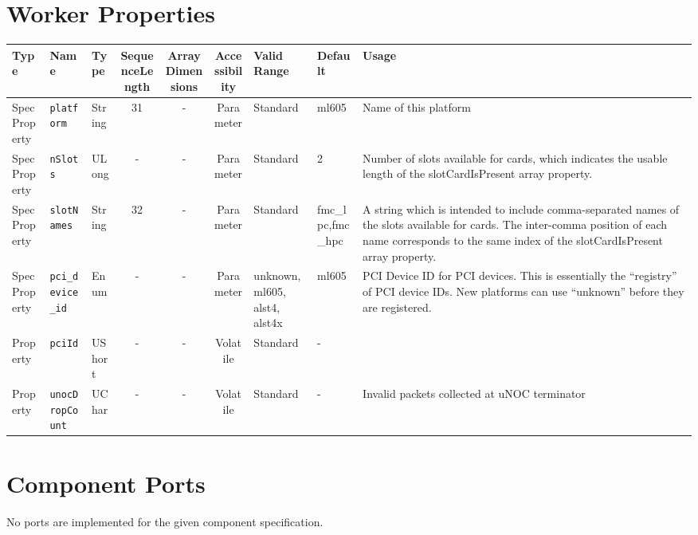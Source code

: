 \documentclass{article}
\begin{document}
\begin{landscape}
	\section*{Worker Properties}
	\begin{scriptsize}
		\begin{tabular}{|p{1.5cm}|p{2.5cm}|p{1cm}|c|c|c|p{2cm}|p{2cm}|p{3cm}|}
			\hline
			\rowcolor{blue}
			Type     & Name                      & Type  & SequenceLength & ArrayDimensions & Accessibility       & Valid Range & Default & Usage                                      \\
			\hline
			SpecProperty & \verb+platform+       & String & 31            & -               & Parameter & Standard & ml605 & Name of this platform               \\
			\hline
			SpecProperty & \verb+nSlots+         & ULong  & -             & -               & Parameter & Standard & 2 & Number of slots available for cards, which indicates the usable length of the slotCardIsPresent array property. \\
			\hline
			SpecProperty & \verb+slotNames+      & String & 32            & -               & Parameter & Standard & fmc\_lpc,fmc\_hpc & A string which is intended to include comma-separated names of the slots available for cards. The inter-comma position of each name corresponds to the same index of the slotCardIsPresent array property. \\
			\hline
			SpecProperty & \verb+pci_device_id+ & Enum & -              & -               & Parameter & unknown, ml605, alst4, alst4x & ml605 & PCI Device ID for PCI devices. This is essentially the ``registry'' of PCI device IDs. New platforms can use ``unknown'' before they are registered. \\
			\hline
			Property & \verb+pciId+              & UShort & -             & -               & Volatile            & Standard    & -       &                                  \\
			\hline
			Property & \verb+unocDropCount+      & UChar & -              & -               & Volatile            & Standard    & -       & Invalid packets collected at uNOC terminator \\
			\hline
		\end{tabular}
	\end{scriptsize}

	\section*{Component Ports}
	No ports are implemented for the given component specification.


\end{landscape}
\end{document}
